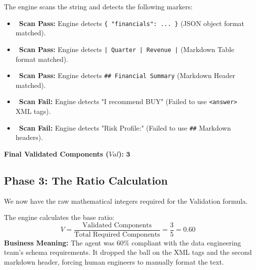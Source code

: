 \documentclass[11pt,a4paper]{article}
\begin{document}
\begin{tcolorbox}[enhanced, colback=dpicloud!5!white, colframe=dpiteal, title={\textbf{Phase 2: The Structure Scanner (`\_looks\_structured`)}}, fonttitle=\bfseries]
The engine scans the string and detects the following markers:
\vspace{0.2cm}
\begin{itemize}
    \item \faCheckCircle\ \textbf{Scan Pass:} Engine detects \texttt{\{ "financials": ... \}} (JSON object format matched).
    \item \faCheckCircle\ \textbf{Scan Pass:} Engine detects \texttt{| Quarter | Revenue |} (Markdown Table format matched).
    \item \faCheckCircle\ \textbf{Scan Pass:} Engine detects \texttt{\#\# Financial Summary} (Markdown Header matched).
    \item \faTimesCircle\ \textbf{Scan Fail:} Engine detects "I recommend BUY" (Failed to use \texttt{<answer>} XML tags).
    \item \faTimesCircle\ \textbf{Scan Fail:} Engine detects "Risk Profile:" (Failed to use \texttt{\#\#} Markdown headers).
\end{itemize}

\vspace{0.2cm}
\textbf{Final Validated Components ($Val$):} $\mathbf{3}$
\end{tcolorbox}

\newpage

\subsection{Phase 3: The Ratio Calculation}

We now have the raw mathematical integers required for the Validation formula.

\begin{tcolorbox}[enhanced, colback=orange!5!white, colframe=orange, title={\textbf{Phase 3: Calculating $V$}}, fonttitle=\bfseries]
The engine calculates the base ratio:
\[
V = \frac{\text{Validated Components}}{\text{Total Required Components}} = \frac{3}{5} = \mathbf{0.60}
\]
\textbf{Business Meaning:} The agent was $60\%$ compliant with the data engineering team's schema requirements. It dropped the ball on the XML tags and the second markdown header, forcing human engineers to manually format the text.
\end{tcolorbox}
\end{document}
